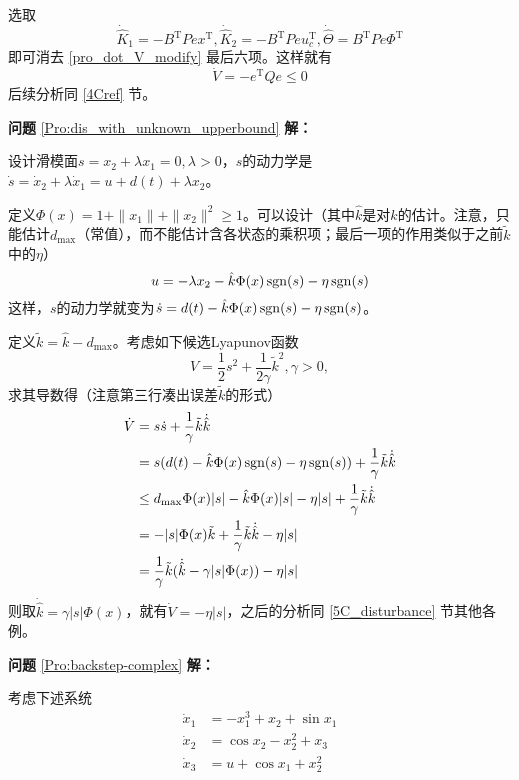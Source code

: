 选取
\[\dot{\hat{K}} _1 = -  B^\mathrm{T}  P  e  x^\mathrm{T}, \dot{\hat{K}} _2 = -  B^\mathrm{T}  P  e  u^\mathrm{T}_c,\dot{\hat{\Theta}}=B^\mathrm{T}Pe\Phi^\mathrm{T}\]
即可消去 \eqref{pro_dot_V_modify} 最后六项。这样就有
\[ \dot{V} = - e^\mathrm{T} Q  e \leq 0 \]
后续分析同 \ref{4Cref} 节。

\noindent\textbf{问题} \ref{Pro:dis_with_unknown_upperbound} \textbf{解：}

设计滑模面$s = x_2 + \lambda x_1 = 0,  \lambda > 0$，$s$的动力学是 $\dot{s} = \dot{x}_2 + \lambda \dot{x}_1 = u + d (t)
  + \lambda x_2$。

定义$\Phi(x)=1 + \| x_1 \| + \| x_2 \|^2\ge 1$。可以设计（其中$\hat{k}$是对$k$的估计。注意，只能估计$d_{\max}$（常值），而不能估计含各状态的乘积项；最后一项的作用类似于之前$\tilde{k}$中的$\eta$）
  \[ u = - \lambda x_2 - \hat{k}\Phi(x) \operatorname{sgn} (s) -\eta\operatorname{sgn}(s)\]
这样，$s$的动力学就变为$\dot{s}=d(t)-\hat{k}\Phi(x) \operatorname{sgn} (s)-\eta\operatorname{sgn}(s)$。

定义$\tilde{k}=\hat{k}-d_{\max}$。考虑如下候选Lyapunov函数
  \[ V = \frac{1}{2} s^2 + \frac{1}{2 \gamma} \tilde{k}^2, \gamma > 0, \]
  求其导数得（注意第三行凑出误差$\tilde{k}$的形式）
  \begin{align*}
    \dot{V} & = s  \dot{s} + \frac{1}{\gamma} \tilde{k} \dot{\hat{k}}\\
    &=s(d(t)-\hat{k}\Phi(x)\operatorname{sgn}(s)-\eta\operatorname{sgn}(s))+\frac{1}{\gamma} \tilde{k} \dot{\hat{k}}\\
    & \leq d_{\max}\Phi(x)|s|-\hat{k}\Phi(x)|s|-\eta|s|+\frac{1}{\gamma} \tilde{k} \dot{\hat{k}}\\
    & = -|s|\Phi(x)\tilde{k}+\frac{1}{\gamma} \tilde{k} \dot{\hat{k}}-\eta|s|\\
    &= \frac{1}{\gamma}\tilde{k} (\dot{\hat{k}}-\gamma |s|\Phi(x))-\eta|s|
  \end{align*}
则取$\dot{\hat{k}}=\gamma |s|\Phi(x)$，就有$\dot{V}=-\eta|s|$，之后的分析同 \ref{5C_disturbance} 节其他各例。

\noindent\textbf{问题} \ref{Pro:backstep-complex} \textbf{解：}

考虑下述系统 \begin{align*}
    \dot{x}_1 & = -x_1^3+ x_2+\sin x_1\\
    \dot{x}_2 & = \cos x_2-x_2^2 + x_3 \\
    \dot{x}_3 & = u +\cos x_1 +x_2^2
  \end{align*}


